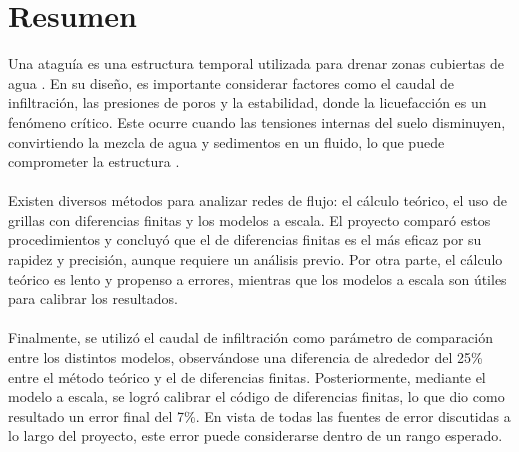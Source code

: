 \section*{Resumen}
Una ataguía es una estructura temporal utilizada para drenar zonas cubiertas de agua 
\cite{madanayaka2018}. En su diseño, es importante considerar factores como 
el caudal de infiltración, las presiones de poros y la estabilidad, donde la licuefacción
 es un fenómeno crítico. Este ocurre cuando las tensiones internas del suelo disminuyen,
  convirtiendo la mezcla de agua y sedimentos en un fluido, lo que puede comprometer 
  la estructura \cite{sumer2009}.
\\ \\
Existen diversos métodos para analizar redes de flujo: el cálculo teórico, 
el uso de grillas con diferencias finitas y los modelos a escala. El proyecto 
comparó estos procedimientos y concluyó que el de diferencias finitas es el más eficaz
 por su rapidez y precisión, aunque requiere un análisis previo. Por otra parte, el cálculo teórico es 
 lento y propenso a errores, mientras que los modelos a escala son útiles para calibrar 
 los resultados.
\\ \\
Finalmente, se utilizó el caudal de infiltración como parámetro de comparación entre los 
distintos modelos, observándose una diferencia de alrededor del 25\% entre el método
 teórico y el de diferencias finitas. Posteriormente, mediante el modelo a escala,
  se logró calibrar el código de diferencias finitas, lo que dio como resultado un error final del 
  7\%. En vista de todas las fuentes de error discutidas a lo largo del proyecto, 
  este error puede considerarse dentro de un rango esperado.
